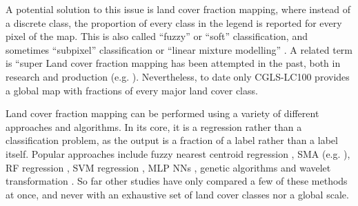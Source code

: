 \documentclass[a4paper,10pt]{article}
\begin{document}
A potential solution to this issue is land cover fraction mapping, where instead of a discrete class, the proportion of every class in the legend is reported for every pixel of the map.
This is also called ``fuzzy'' or ``soft'' classification, and sometimes ``subpixel'' classification or ``linear mixture modelling'' \citep{Okeke2006fuzzyexponent}. A related term is ``super
Land cover fraction mapping has been attempted in the past, both in research \citep{adams_classification_1995, foody1996fuzzyevaluation, colditz_land_2011, sharma_assessing_2011, uma_shankar_wavelet-fuzzy_2011, dwivedi_optimisation_2012, lizarazo_quantitative_2012, gessner_estimating_2013, okujeni_generalizing_2018} and production (e.g. \citealp{hansen2000hardtree, hansen_continuous_2011, pengra_global_2015, hansen_global_2003, sexton_global_2013}).
Nevertheless, to date only \ac{CGLS-LC100} provides a global map with fractions of every major land cover class.

Land cover fraction mapping can be performed using a variety of different approaches and algorithms.
In its core, it is a regression rather than a classification problem, as the output is a fraction of a label rather than a label itself.
Popular approaches include fuzzy nearest centroid regression \citep{zhang2001fullyfuzzy}, \ac{SMA} (e.g. \citealp{yang_landsat_2012, hobbs2003linear, shimabukuro1991least}), \ac{RF} regression \citep{schwieder_estimating_2014}, \gls{SVM} regression \citep{schwieder_estimating_2014}, \gls{MLP} \glspl{NN} \citep{zhang2001fullyfuzzy}, genetic algorithms \citep{stavrakoudis_boosted_2011} and wavelet transformation \citep{uma_shankar_wavelet-fuzzy_2011}.
So far other studies have only compared a few of these methods at once, and never with an exhaustive set of land cover classes nor a global scale.


\end{document}
